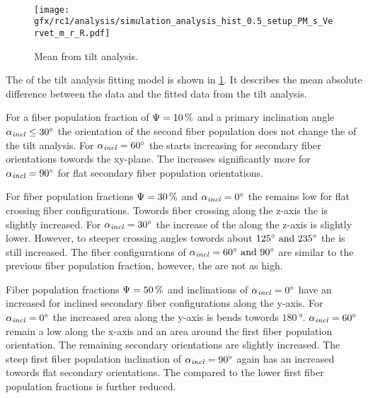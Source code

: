 \paragraph{\rvalue}
% 
\begin{figure}[!p]
\centering
\texttt{[image: gfx/rc1/analysis/simulation\_analysis\_hist\_0.5\_setup\_PM\_s\_Vervet\_m\_r\_R.pdf]}
\caption{Mean \rvalue{} from tilt analysis. }
\label{fig:sim_ana_rvalue}
\end{figure}
% 
The \rvalue{} of the tilt analysis fitting model is shown in \cref{fig:sim_ana_rvalue}.
It describes the mean absolute difference between the data and the fitted data from the tilt analysis.
\par
%
For a fiber population fraction of $\textnormal{$\Psi$}=\SI{10}{\percent}$ and a primary inclination angle $\textnormal{$\alpha_{\mathit{incl}}$}\leq\SI{30}{\degree}$ the orientation of the second fiber population does not change the \rvalue{} of the tilt analysis.
For $\textnormal{$\alpha_{\mathit{incl}}$}=\SI{60}{\degree}$ the \rvalue{} starts increasing for secondary fiber orientations towords the xy-plane.
The \rvalue{} increases significantly more for $\textnormal{$\alpha_{\mathit{incl}}$}=\SI{90}{\degree}$ for flat secondary fiber population orientations.
\par
% 
For fiber population fractions $\textnormal{$\Psi$}=\SI{30}{\percent}$ and $\textnormal{$\alpha_{\mathit{incl}}$}=\SI{0}{\degree}$ the \rvalue{} remains low for flat crossing fiber configurations.
Towords fiber crossing along the z-axis the \rvalue{} is slightly increased.
For $\textnormal{$\alpha_{\mathit{incl}}$}=\SI{30}{\degree}$ the increase of the \rvalue{} along the z-axis is slightly lower.
However, to steeper crossing angles towords about $\SIlist{125;235}{\degree}$ the \rvalue{} is still increased.
The fiber configurations of $\modelInc=\SIlist{60;90}{\degree}$ are similar to the previous fiber population fraction, however, the \rvalue{} are not as high.
\par
%
Fiber population fractions $\textnormal{$\Psi$}=\SI{50}{\percent}$ and inclinations of $\textnormal{$\alpha_{\mathit{incl}}$}=\SI{0}{\degree}$ have an increased \rvalue{} for inclined secondary fiber configurations along the y-axis.
For $\textnormal{$\alpha_{\mathit{incl}}$}=\SI{0}{\degree}$ the increased area along the y-axis is bends towords $\SI{180}{\degree}$.
$\textnormal{$\alpha_{\mathit{incl}}$}=\SI{60}{\degree}$ remain a low \rvalue{} along the x-axis and an area around the first fiber population orientation.
The remaining secondary orientations are slightly increased.
The steep first fiber population inclination of $\textnormal{$\alpha_{\mathit{incl}}$}=\SI{90}{\degree}$ again has an increased \rvalue{} towords flat secondary orientations.
The \rvalue{} compared to the lower first fiber population fractions is further reduced.
